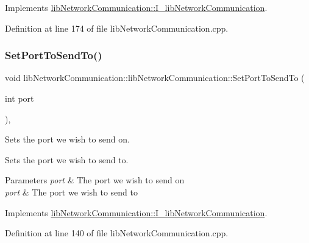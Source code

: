 Implements \mbox{\hyperlink{classlibNetworkCommunication_1_1I__libNetworkCommunication_a7f23008156d44d5f6db117243ee687e6}{lib\+Network\+Communication\+::\+I\+\_\+lib\+Network\+Communication}}.



Definition at line 174 of file lib\+Network\+Communication.\+cpp.

\mbox{\label{classlibNetworkCommunication_1_1libNetworkCommunication_a9521f7bfbb8365956239846806e745b6}} 
\subsubsection{\texorpdfstring{SetPortToSendTo()}{SetPortToSendTo()}}
{\footnotesize\ttfamily void lib\+Network\+Communication\+::lib\+Network\+Communication\+::\+Set\+Port\+To\+Send\+To (\begin{DoxyParamCaption}\item[{int}]{port }\end{DoxyParamCaption})\hspace{0.3cm}{\ttfamily [override]}, {\ttfamily [virtual]}}



Sets the port we wish to send on. 

Sets the port we wish to send to.


\begin{DoxyParams}{Parameters}
{\em port} & The port we wish to send on\\
\hline
{\em port} & The port we wish to send to \\
\hline
\end{DoxyParams}


Implements \mbox{\hyperlink{classlibNetworkCommunication_1_1I__libNetworkCommunication_a76dc179dc445ce063ad0ce969a0409c6}{lib\+Network\+Communication\+::\+I\+\_\+lib\+Network\+Communication}}.



Definition at line 140 of file lib\+Network\+Communication.\+cpp.

\mbox{\label{classlibNetworkCommunication_1_1libNetworkCommunication_a5b95053e05ce720b7f18d275c65d6965}} 
